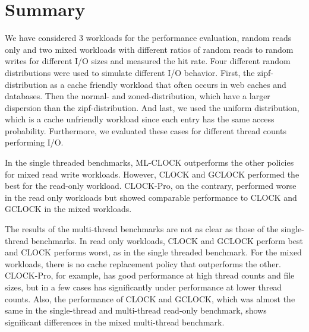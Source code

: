 \documentclass[
	12pt,
	a4paper,
	abstract,
	bibliography=totoc,
	chapterprefix,
	headings=openright,
	numbers=endperiod,
	parskip=half,
	twoside,
]{scrreprt}
\begin{document}
\section{Summary}

We have considered 3 workloads for the performance evaluation,
random reads only and two mixed workloads with different ratios of random reads to random writes for different I/O sizes
and measured the hit rate.
Four different random distributions were used to simulate different I/O behavior.
First, the zipf-distribution as a cache friendly workload that often occurs in web caches and databases.
Then the normal- and zoned-distribution, which have a larger dispersion than the zipf-distribution.
And last, we used the uniform distribution, which is a cache unfriendly workload since each entry
has the same access probability.
Furthermore, we evaluated these cases for different thread counts performing I/O.

In the single threaded benchmarks, ML-CLOCK outperforms the other policies for mixed read write workloads.
However, CLOCK and GCLOCK performed the best for the read-only workload.
CLOCK-Pro, on the contrary, performed worse in the read only workloads 
but showed comparable performance to CLOCK and GCLOCK in the mixed workloads.

The results of the multi-thread benchmarks are not as clear as those of the single-thread benchmarks.
In read only workloads, CLOCK and GCLOCK perform best and CLOCK performs worst, as in the single threaded benchmark.
For the mixed workloads, there is no cache replacement policy that outperforms the other.
CLOCK-Pro, for example, has good performance at high thread counts and file sizes, but in a few cases has significantly 
under performance at lower thread counts.
Also, the performance of CLOCK and GCLOCK, which was almost the same in the single-thread and 
multi-thread read-only benchmark, shows significant 
differences in the mixed multi-thread benchmark.
\end{document}
